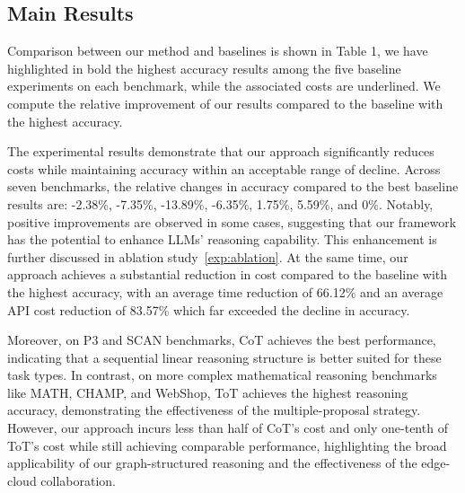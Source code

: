 
\vspace{-3mm}
\subsection{Main Results}

Comparison between our method and baselines is shown in Table 1, we have highlighted in bold the highest accuracy results among the five baseline experiments on each benchmark, while the associated costs are underlined. We compute the relative improvement of our results compared to the baseline with the highest accuracy.

The experimental results demonstrate that our approach significantly reduces costs while maintaining accuracy within an acceptable range of decline. Across seven benchmarks, the relative changes in accuracy compared to the best baseline results are: -2.38\%, -7.35\%, -13.89\%, -6.35\%, 1.75\%, 5.59\%, and 0\%. Notably, positive improvements are observed in some cases, suggesting that our framework has the potential to enhance LLMs' reasoning capability. This enhancement is further discussed in ablation study~\ref{exp:ablation}. At the same time, our approach achieves a substantial reduction in cost compared to the baseline with the highest accuracy, with an average time reduction of 66.12\% and an average API cost reduction of 83.57\% which far exceeded the decline in accuracy.

Moreover, on P3 and SCAN benchmarks, CoT achieves the best performance, indicating that a sequential linear reasoning structure is better suited for these task types. In contrast, on more complex mathematical reasoning benchmarks like MATH, CHAMP, and WebShop, ToT achieves the highest reasoning accuracy, demonstrating the effectiveness of the multiple-proposal strategy. However, our approach incurs less than half of CoT's cost and only one-tenth of ToT's cost while still achieving comparable performance, highlighting the broad applicability of our graph-structured reasoning and the effectiveness of the edge-cloud collaboration. 

